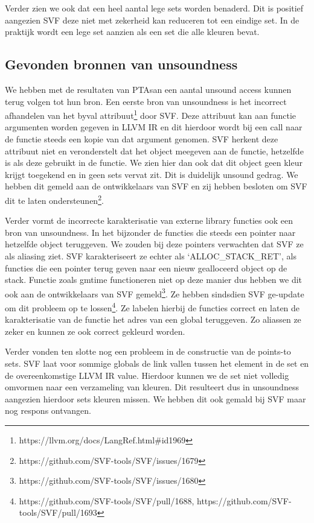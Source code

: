 \documentclass[conference]{IEEEtran}
\begin{document}
Verder zien we ook dat een heel aantal lege sets worden benaderd. Dit is positief aangezien SVF deze niet met zekerheid kan reduceren tot een eindige set. In de praktijk wordt een lege set aanzien als een set die alle kleuren bevat.

\subsection{Gevonden bronnen van unsoundness}

We hebben met de resultaten van PTAsan een aantal unsound access kunnen terug volgen tot hun bron. Een eerste bron van unsoundness is het incorrect afhandelen van het byval attribuut\footnote{https://llvm.org/docs/LangRef.html\#id1969} door SVF. Deze attribuut kan aan functie argumenten worden gegeven in LLVM IR en dit hierdoor wordt bij een call naar de functie steeds een kopie van dat argument genomen. SVF herkent deze attribuut niet en veronderstelt dat het object meegeven aan de functie, hetzelfde is als deze gebruikt in de functie. We zien hier dan ook dat dit object geen kleur krijgt toegekend en in geen sets vervat zit. Dit is duidelijk unsound gedrag. We hebben dit gemeld aan de ontwikkelaars van SVF en zij hebben besloten om SVF dit te laten ondersteunen\footnote{https://github.com/SVF-tools/SVF/issues/1679}.

Verder vormt de incorrecte karakterisatie van externe library functies ook een bron van unsoundness. In het bijzonder de functies die steeds een pointer naar hetzelfde object teruggeven. We zouden bij deze pointers verwachten dat SVF ze als aliasing ziet. SVF karakteriseert ze echter als `ALLOC\_STACK\_RET', als functies die een pointer terug geven naar een nieuw gealloceerd object op de stack. Functie zoals gmtime functioneren niet op deze manier dus hebben we dit ook aan de ontwikkelaars van SVF gemeld\footnote{https://github.com/SVF-tools/SVF/issues/1680}. Ze hebben sindsdien SVF ge-update om dit probleem op te lossen\footnote{https://github.com/SVF-tools/SVF/pull/1688, https://github.com/SVF-tools/SVF/pull/1693}. Ze labelen hierbij de functies correct en laten de karakterisatie van de functie het adres van een global teruggeven. Zo aliassen ze zeker en kunnen ze ook correct gekleurd worden. 

Verder vonden ten slotte nog een probleem in de constructie van de points-to sets. SVF laat voor sommige globals de link vallen tussen het element in de set en de overeenkomstige LLVM IR value. Hierdoor kunnen we de set niet volledig omvormen naar een verzameling van kleuren. Dit resulteert dus in unsoundness aangezien hierdoor sets kleuren missen. We hebben dit ook gemald bij SVF maar nog respons ontvangen.
\end{document}
